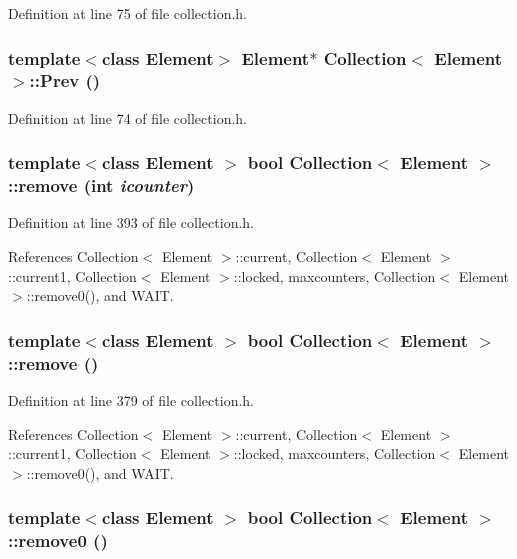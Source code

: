 Definition at line 75 of file collection.h.\hypertarget{classCollection_696a19ba00545ca8092e57ac7dd7cb93}{
\subsubsection[{Prev}]{\setlength{\rightskip}{0pt plus 5cm}template$<$class Element$>$ Element$\ast$ {\bf Collection}$<$ Element $>$::Prev ()}}
\label{classCollection_696a19ba00545ca8092e57ac7dd7cb93}




Definition at line 74 of file collection.h.\hypertarget{classCollection_c14a82d2f927c0e8fc43213c91612e2b}{
\subsubsection[{remove}]{\setlength{\rightskip}{0pt plus 5cm}template$<$class Element $>$ bool {\bf Collection}$<$ Element $>$::remove (int {\em icounter})}}
\label{classCollection_c14a82d2f927c0e8fc43213c91612e2b}




Definition at line 393 of file collection.h.

References Collection$<$ Element $>$::current, Collection$<$ Element $>$::current1, Collection$<$ Element $>$::locked, maxcounters, Collection$<$ Element $>$::remove0(), and WAIT.\hypertarget{classCollection_167f3b300994369663deef64361affa9}{
\subsubsection[{remove}]{\setlength{\rightskip}{0pt plus 5cm}template$<$class Element $>$ bool {\bf Collection}$<$ Element $>$::remove ()}}
\label{classCollection_167f3b300994369663deef64361affa9}




Definition at line 379 of file collection.h.

References Collection$<$ Element $>$::current, Collection$<$ Element $>$::current1, Collection$<$ Element $>$::locked, maxcounters, Collection$<$ Element $>$::remove0(), and WAIT.\hypertarget{classCollection_d106f32d2b9201c2d6bf37912387d4f6}{
\subsubsection[{remove0}]{\setlength{\rightskip}{0pt plus 5cm}template$<$class Element $>$ bool {\bf Collection}$<$ Element $>$::remove0 ()}}
\label{classCollection_d106f32d2b9201c2d6bf37912387d4f6}




